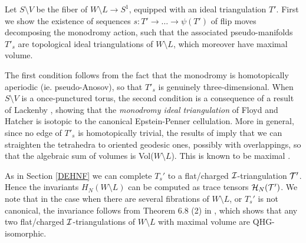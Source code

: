  Let $S\setminus V$ be the fiber of $W\setminus
L \rightarrow S^1$, equipped with an ideal triangulation $T'$. First
we show the existence of sequences $s:T'\rightarrow \ldots \rightarrow
\psi(T')$ of flip moves decomposing the monodromy action, such that
the associated pseudo-manifolds $T'_s$ are topological ideal
triangulations of $W\setminus L$, which moreover have maximal
volume. 

The first condition follows from the fact that the monodromy is
homotopically aperiodic (ie. pseudo-Anosov), so that $T'_s$ is
genuinely three-dimensional. When $S\setminus V$ is a once-punctured
torus, the second condition is a consequence of a result of Lackenby
\cite{La}, showing that the {\it monodromy ideal triangulation} of
Floyd and Hatcher \cite{FH} is isotopic to the canonical
Epstein-Penner cellulation. More in general, since no edge of $T'_s$
is homotopically trivial, the results of \cite{F1} imply that we can
straighten the tetrahedra to oriented geodesic ones, possibly with
overlappings, so that the algebraic sum of volumes is Vol($W\setminus
L$). This is known to be maximal \cite{F2}.

As in Section \ref{DEHNF} we can complete $T_s'$ to a flat/charged
${\mathcal I}$-triangulation ${\mathcal T}'$. Hence the invariants $H_N(W\setminus L)$
can be computed as trace tensors ${\mathcal H}_N({\mathcal T}')$. We note that in the
case when there are several fibrations of $W\setminus L$, or $T_s'$ is
not canonical, the invariance follows from Theorem 6.8 (2) in
\cite{BB2}, which shows that any two flat/charged ${\mathcal I}$-triangulations
of $W\setminus L$ with maximal volume are QHG-isomorphic.

